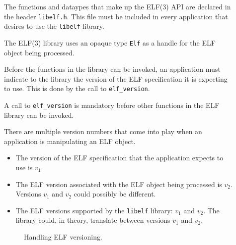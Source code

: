 \documentclass[a4paper,pdftex]{book}
\makeatletter
\newcommand{\function}[1]{\texttt{#1}}
\newcommand{\filename}[1]{\texttt{#1}}
\newcommand{\library}[1]{\texttt{#1}}
\newcommand{\type}[1]{\texttt{#1}}
\newenvironment{callout}[2][black]{%
  \begingroup\newcommand{\@cocolor}{#1}%
  \setlength{\shadowsize}{1.2pt}%
  \newcommand{\@cogroup}[1]{#2}}{\endgroup}
\newcommand{\@co}[1]{\shadowbox{\color{\@cocolor}#1}}
\newcommand{\coref}[1]{%
  \hypertarget{\@cogroup.#1.cr}{%
    \hyperlink{\@cogroup.#1.co}{\@co{#1}}}}
\makeatother
\begin{document}
\begin{callout}{prog1}
  

  \begin{description}
  \item[\coref{1}] The functions and dataypes that make up the ELF(3) API
    are declared in the header \filename{libelf.h}.  This file must be included
    in every application that desires to use the \library{libelf}
    library.%
    \index{libelf@\library{libelf}!header \filename{elf.h}}

  \item[\coref{2}] The ELF(3) library uses an opaque type \type{Elf} as a
    handle for the ELF object being processed.

  \item[\coref{4}] Before the functions in the library can be invoked, an
    application must indicate to the library the version of the ELF
    specification it is expecting to use.  This is done by the call to
    \function{elf\_version}.

    A call to \function{elf\_version} is mandatory before other
    functions in the ELF library can be invoked.

    There are multiple version numbers that come into play when an
    application is manipulating an ELF object.

    \begin{itemize}
    \item The version of the ELF specification that the application
      expects to use is $v_1$.
    \item The ELF version associated with the ELF object being
      processed is $v_2$.  Versions $v_1$ and $v_2$ could possibly be
      different.
    \item The ELF versions supported by the \library{libelf} library:
      $v_1$ and $v_2$.  The library could, in theory, translate
      between versions $v_1$ and $v_2$.
    \end{itemize}

    \begin{figure}
      \caption{Handling ELF versioning.}\label{fig.versions}
    \end{figure}


\end{description}
\end{callout}
\end{document}

